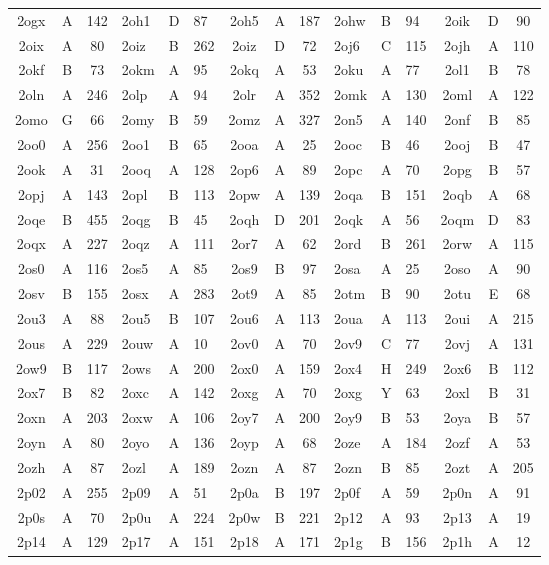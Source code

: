 \begin{longtable}{|c|c|c| a|a|a| c|c|c| a|a|a| c|c|c|}
2ogx & A & 142 & 2oh1 & D & 87 & 2oh5 & A & 187 & 2ohw & B & 94 & 2oik & D & 90\\
2oix & A & 80 & 2oiz & B & 262 & 2oiz & D & 72 & 2oj6 & C & 115 & 2ojh & A & 110\\
2okf & B & 73 & 2okm & A & 95 & 2okq & A & 53 & 2oku & A & 77 & 2ol1 & B & 78\\
2oln & A & 246 & 2olp & A & 94 & 2olr & A & 352 & 2omk & A & 130 & 2oml & A & 122\\
2omo & G & 66 & 2omy & B & 59 & 2omz & A & 327 & 2on5 & A & 140 & 2onf & B & 85\\
2oo0 & A & 256 & 2oo1 & B & 65 & 2ooa & A & 25 & 2ooc & B & 46 & 2ooj & B & 47\\
2ook & A & 31 & 2ooq & A & 128 & 2op6 & A & 89 & 2opc & A & 70 & 2opg & B & 57\\
2opj & A & 143 & 2opl & B & 113 & 2opw & A & 139 & 2oqa & B & 151 & 2oqb & A & 68\\
2oqe & B & 455 & 2oqg & B & 45 & 2oqh & D & 201 & 2oqk & A & 56 & 2oqm & D & 83\\
2oqx & A & 227 & 2oqz & A & 111 & 2or7 & A & 62 & 2ord & B & 261 & 2orw & A & 115\\
2os0 & A & 116 & 2os5 & A & 85 & 2os9 & B & 97 & 2osa & A & 25 & 2oso & A & 90\\
2osv & B & 155 & 2osx & A & 283 & 2ot9 & A & 85 & 2otm & B & 90 & 2otu & E & 68\\
2ou3 & A & 88 & 2ou5 & B & 107 & 2ou6 & A & 113 & 2oua & A & 113 & 2oui & A & 215\\
2ous & A & 229 & 2ouw & A & 10 & 2ov0 & A & 70 & 2ov9 & C & 77 & 2ovj & A & 131\\
2ow9 & B & 117 & 2ows & A & 200 & 2ox0 & A & 159 & 2ox4 & H & 249 & 2ox6 & B & 112\\
2ox7 & B & 82 & 2oxc & A & 142 & 2oxg & A & 70 & 2oxg & Y & 63 & 2oxl & B & 31\\
2oxn & A & 203 & 2oxw & A & 106 & 2oy7 & A & 200 & 2oy9 & B & 53 & 2oya & B & 57\\
2oyn & A & 80 & 2oyo & A & 136 & 2oyp & A & 68 & 2oze & A & 184 & 2ozf & A & 53\\
2ozh & A & 87 & 2ozl & A & 189 & 2ozn & A & 87 & 2ozn & B & 85 & 2ozt & A & 205\\
2p02 & A & 255 & 2p09 & A & 51 & 2p0a & B & 197 & 2p0f & A & 59 & 2p0n & A & 91\\
2p0s & A & 70 & 2p0u & A & 224 & 2p0w & B & 221 & 2p12 & A & 93 & 2p13 & A & 19\\
2p14 & A & 129 & 2p17 & A & 151 & 2p18 & A & 171 & 2p1g & B & 156 & 2p1h & A & 12\\

\end{longtable}
